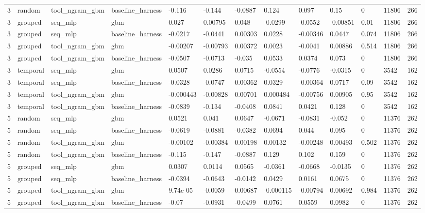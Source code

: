 \begin{tabular}{lllllllllllll}
3 & random & tool\_ngram\_gbm & baseline\_harness & -0.116 & -0.144 & -0.0887 & 0.124 & 0.097 & 0.15 & 0 & 11806 & 266 \\
3 & grouped & seq\_mlp & gbm & 0.027 & 0.00795 & 0.048 & -0.0299 & -0.0552 & -0.00851 & 0.01 & 11806 & 266 \\
3 & grouped & seq\_mlp & baseline\_harness & -0.0217 & -0.0441 & 0.00303 & 0.0228 & -0.00346 & 0.0447 & 0.074 & 11806 & 266 \\
3 & grouped & tool\_ngram\_gbm & gbm & -0.00207 & -0.00793 & 0.00372 & 0.0023 & -0.0041 & 0.00886 & 0.514 & 11806 & 266 \\
3 & grouped & tool\_ngram\_gbm & baseline\_harness & -0.0507 & -0.0713 & -0.035 & 0.0533 & 0.0374 & 0.073 & 0 & 11806 & 266 \\
3 & temporal & seq\_mlp & gbm & 0.0507 & 0.0286 & 0.0715 & -0.0554 & -0.0776 & -0.0315 & 0 & 3542 & 162 \\
3 & temporal & seq\_mlp & baseline\_harness & -0.0328 & -0.0747 & 0.00362 & 0.0329 & -0.00364 & 0.0717 & 0.09 & 3542 & 162 \\
3 & temporal & tool\_ngram\_gbm & gbm & -0.000443 & -0.00828 & 0.00701 & 0.000484 & -0.00756 & 0.00905 & 0.95 & 3542 & 162 \\
3 & temporal & tool\_ngram\_gbm & baseline\_harness & -0.0839 & -0.134 & -0.0408 & 0.0841 & 0.0421 & 0.128 & 0 & 3542 & 162 \\
5 & random & seq\_mlp & gbm & 0.0521 & 0.041 & 0.0647 & -0.0671 & -0.0831 & -0.052 & 0 & 11376 & 262 \\
5 & random & seq\_mlp & baseline\_harness & -0.0619 & -0.0881 & -0.0382 & 0.0694 & 0.044 & 0.095 & 0 & 11376 & 262 \\
5 & random & tool\_ngram\_gbm & gbm & -0.00102 & -0.00384 & 0.00198 & 0.00132 & -0.00248 & 0.00493 & 0.502 & 11376 & 262 \\
5 & random & tool\_ngram\_gbm & baseline\_harness & -0.115 & -0.147 & -0.0887 & 0.129 & 0.102 & 0.159 & 0 & 11376 & 262 \\
5 & grouped & seq\_mlp & gbm & 0.0307 & 0.0114 & 0.0565 & -0.0361 & -0.0668 & -0.0135 & 0 & 11376 & 262 \\
5 & grouped & seq\_mlp & baseline\_harness & -0.0394 & -0.0643 & -0.0142 & 0.0429 & 0.0161 & 0.0675 & 0 & 11376 & 262 \\
5 & grouped & tool\_ngram\_gbm & gbm & 9.74e-05 & -0.0059 & 0.00687 & -0.000115 & -0.00794 & 0.00692 & 0.984 & 11376 & 262 \\
5 & grouped & tool\_ngram\_gbm & baseline\_harness & -0.07 & -0.0931 & -0.0499 & 0.0761 & 0.0559 & 0.0982 & 0 & 11376 & 262 \\

\end{tabular}
